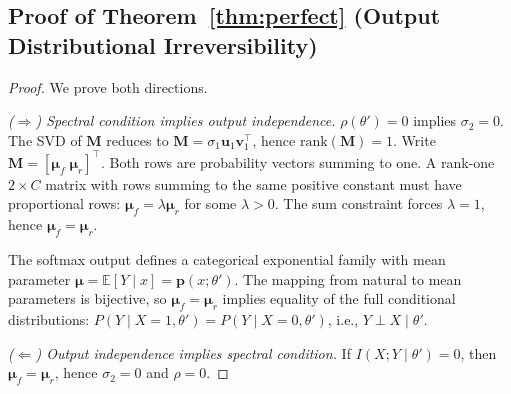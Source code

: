 \documentclass[journal]{IEEEtran}
\theoremstyle{definition}
\begin{document}
\subsection{Proof of Theorem~\ref{thm:perfect} (Output Distributional Irreversibility)}
\begin{proof}
We prove both directions.

\noindent\textit{($\Rightarrow$) Spectral condition implies output independence.}
$\rho(\theta')=0$ implies $\sigma_2=0$. The SVD of $\mathbf{M}$ reduces to $\mathbf{M}=\sigma_1\mathbf{u}_1\mathbf{v}_1^\top$, hence $\mathrm{rank}(\mathbf{M})=1$. Write $\mathbf{M}=[\boldsymbol{\mu}_f\;\boldsymbol{\mu}_r]^\top$. Both rows are probability vectors summing to one. A rank-one $2\times C$ matrix with rows summing to the same positive constant must have proportional rows: $\boldsymbol{\mu}_f = \lambda \boldsymbol{\mu}_r$ for some $\lambda>0$. The sum constraint forces $\lambda=1$, hence $\boldsymbol{\mu}_f = \boldsymbol{\mu}_r$.

The softmax output defines a categorical exponential family with mean parameter $\boldsymbol{\mu}=\mathbb{E}[Y\mid x]=\mathbf{p}(x;\theta')$. The mapping from natural to mean parameters is bijective, so $\boldsymbol{\mu}_f=\boldsymbol{\mu}_r$ implies equality of the full conditional distributions: $P(Y\mid X=1,\theta') = P(Y\mid X=0,\theta')$, i.e., $Y \perp X \mid \theta'$.

\noindent\textit{($\Leftarrow$) Output independence implies spectral condition.}
If $I(X;Y\mid\theta')=0$, then $\boldsymbol{\mu}_f = \boldsymbol{\mu}_r$, hence $\sigma_2=0$ and $\rho=0$.
\end{proof}
\end{document}
